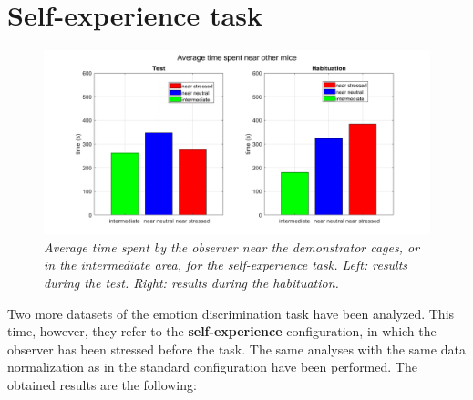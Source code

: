 \documentclass[12pt, a4paper]{report}
\begin{document}
\section{Self-experience task}


\begin{figure}[H]
	
	\begin{center}
		\hspace*{-1.4cm}
		\includegraphics[scale=.5]{times_self.png} 
	\end{center} 
	\caption{\textit{Average time spent by the observer near the demonstrator cages, or in the intermediate area, for the self-experience task. Left: results during the test. Right: results during the habituation.}}
	\label{times_self}
\end{figure}


Two more datasets of the emotion discrimination task have been analyzed. This time, however, they refer to the \textbf{self-experience} configuration, in which the observer has been stressed before the task. The same analyses with the same data normalization as in the standard configuration have been performed. The obtained results are the following:
\end{document}
